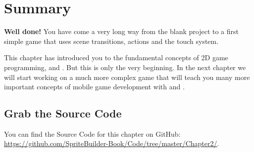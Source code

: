 \section{Summary}

\textbf{Well done!} You have come a very long way from the blank project to a
first simple game that uses scene transitions, actions and the \cocos{} touch
system. 

This chapter has introduced you to the fundamental concepts of 2D game
programming, \SB{} and \cocos{}. But this is only the very beginning. In the
next chapter we will start working on a much more complex game that will teach you many more important
concepts of mobile game development with \SB{} and \cocos{}. 

\subsection{Grab the Source Code}
You can find the Source Code for this chapter on GitHub:
\url{https://github.com/SpriteBuilder-Book/Code/tree/master/Chapter2/}.
